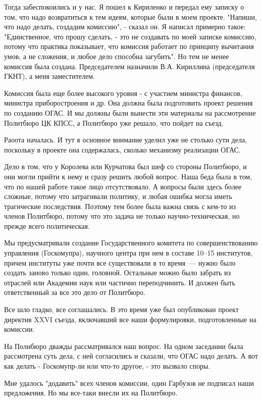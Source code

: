 \documentclass{article}
\begin{document}
Тогда забеспокоились и у нас. Я пошел к Кириленко и передал ему записку о том,
что надо возвратиться к тем идеям, которые были в моем проекте. "Напиши, что
надо делать, создадим комиссию", - сказал он. Я написал примерно такое:
"Единственное, что прошу сделать, - это не создавать по моей записке комиссию,
потому что практика показывает, что комиссия работает по принципу вычитания
умов, а не сложения, и любое дело способна загубить". Но тем не менее комиссия
была создана. Председателем назначили В.А. Кириллина (председателя ГКНТ), а меня
заместителем.

Комиссия была еще более высокого уровня - с участием министра финансов, министра
приборостроения и др. Она должна была подготовить проект решения по созданию
ОГАС. И мы должны были вынести эти материалы на рассмотрение Политбюро ЦК КПСС,
а Политбюро уже решало, что пойдет на съезд.

Раоота началась. И тут я основное внимание уделил уже не столько сути дела,
поскольку в проекте она содержалась, сколько механизму реализации ОГАС.

Дело в том, что у Королева или Курчатова был шеф со стороны Политбюро, и они
могли прийти к нему и сразу решить любой вопрос. Наша беда была в том, что по
нашей работе такое лицо отсутствовало. А вопросы были здесь более сложные,
потому что затрагивали политику, и любая ошибка могла иметь трагические
последствия. Поэтому тем более была важна связь с кем-то из членов Политбюро,
потому что это задача не только научно-техническая, но прежде всего
политическая.

Мы предусматривали создание Государственного комитета по совершенствованию
управления (Госкомупра), научного центра при нем в составе 10--15 институтов,
причем институты уже почти все существовали в то время\ --- нужно было создать
заново только один, головной. Остальные можно было забрать из отраслей или
Академии наук или частично переподчинить. И должен быть ответственный за все это
дело от Политбюро.

Все шло гладко, все соглашались. В это время уже был опубликован проект
директив XXVI съезда, включавший все наши формулировки, подготовленные на
комиссии.

На Полибюро дважды рассматривался наш вопрос. На одном заседании была
рассмотрена суть дела, с ней согласились и сказали, что ОГАС надо делать. А вот
как делать - Госкомупр-ли или что-то другое, - это вызвало споры.

Мне удалось "додавить" всех членов комиссии, один Гарбузов не подписал наши
предложения. Но мы все-таки внесли их на Политбюро.
\end{document}
